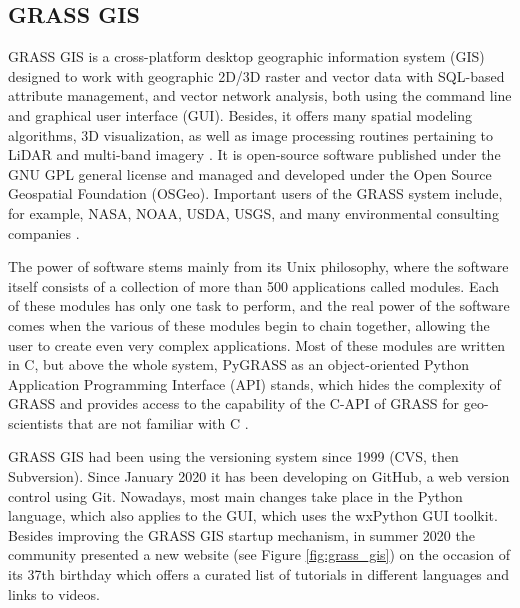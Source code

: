 \documentclass[a4paper,10pt,twoside]{article}
\begin{document}
\newpage
\vspace*{-1cm}
\subsection{GRASS GIS}
\label{subsection:grassgis}
\noindent GRASS GIS is a cross-platform desktop geographic information
system (GIS) designed to work with geographic 2D/3D raster and vector
data with SQL-based attribute management, and vector network analysis,
both using the command line and graphical user interface
(GUI). Besides, it offers many spatial modeling algorithms, 3D
visualization, as well as image processing routines pertaining to
LiDAR and multi-band imagery \cite{NETELER2012124}. It is open-source
software published under the GNU GPL general license and managed and
developed under the Open Source Geospatial Foundation
(OSGeo). Important users of the GRASS system include, for example,
NASA, NOAA, USDA, USGS, and many environmental consulting companies
\cite{grassgis}.

The power of software stems mainly from its Unix philosophy, where the
software itself consists of a collection of more than 500 applications
called modules. Each of these modules has only one task to perform,
and the real power of the software comes when the various of these
modules begin to chain together, allowing the user to create even very
complex applications. Most of these modules are written in C, but
above the whole system, PyGRASS as an object-oriented Python
Application Programming Interface (API) stands, which hides the
complexity of GRASS and provides access to the capability of the C-API
of GRASS for geo-scientists that are not familiar with C
\cite{pygrass}.

GRASS GIS had been using the versioning system since 1999 (CVS, then
Subversion). Since January 2020 it has been developing on GitHub, a web
version control using Git. Nowadays, most main changes take place in
the Python language, which also applies to the GUI, which uses the
wxPython GUI toolkit. Besides improving the GRASS GIS startup mechanism,
in summer 2020 the community presented a new website (see Figure
\ref{fig:grass_gis}) on the occasion of its 37th birthday which offers
a curated list of tutorials in different languages and links to
videos.
\end{document}
